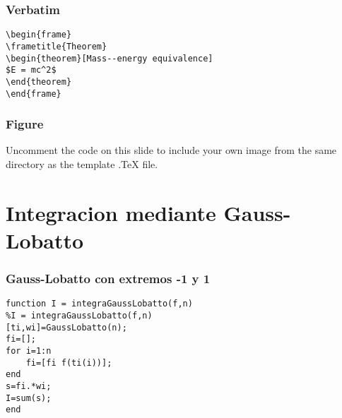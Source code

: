 \documentclass{beamer}
\begin{document}

\begin{frame}[fragile] %
\frametitle{Verbatim}
\begin{example}
\begin{verbatim}
\begin{frame}
\frametitle{Theorem}
\begin{theorem}[Mass--energy equivalence]
$E = mc^2$
\end{theorem}
\end{frame}\end{verbatim}
\end{example}
\end{frame}


\begin{frame}
\frametitle{Figure}
Uncomment the code on this slide to include your own image from the same directory as the template .TeX file.
\end{frame}
\section{Integracion mediante Gauss-Lobatto}

\begin{frame}[fragile] %
\frametitle{Gauss-Lobatto con extremos -1 y 1}
\begin{example}
\begin{verbatim}
function I = integraGaussLobatto(f,n)
%I = integraGaussLobatto(f,n)
[ti,wi]=GaussLobatto(n);
fi=[];
for i=1:n
    fi=[fi f(ti(i))];
end
s=fi.*wi;
I=sum(s);
end\end{verbatim}
\end{example}
\end{frame}



\end{document}
